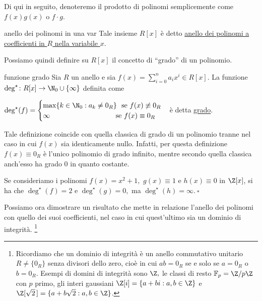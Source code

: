 \noindent Di qui in seguito, denoteremo il prodotto di polinomi semplicemente come $f(x)g(x)$ o $f\cdot g$.

\begin{defn}{anello dei polinomi in una var}
Tale insieme $R[x]$ è detto \underline{anello dei polinomi a coefficienti in $R$ nella variabile $x$}.
\end{defn}

\noindent Possiamo quindi definire su $R[x]$ il concetto di ``grado'' di un polinomio.

\clearpage
\begin{defn}{funzione grado}
Sia $R$ un anello e sia $f(x)=\sum\limits_{i=0}^n a_i x^i\in R[x]$. 
La funzione $\deg^{\star}\colon R[x]\to \N_0\cup \{\infty\}$ definita come 

$\deg^{\star}(f)=\begin{cases} \max\{k\in \N_0: a_k\neq 0_R\} 
\text{ \ se }f(x)\not\equiv 0_R \\ \infty 
\text{ \ \ \ \ \ \ \ \ \ \ \ \ \ \ \ \ \ \ \ \ \ \ \ \ \ \ \ se } 
f(x)\equiv 0_R\end{cases}$è detta \underline{grado}.\footnotemark
\end{defn}


\noindent Tale definizione coincide con quella classica di grado di un polinomio tranne nel caso in cui 
$f(x)$ sia identicamente nullo. Infatti, per questa definizione $f(x)\equiv 0_R$ è l'unico polinomio di grado infinito, 
mentre secondo quella classica anch'esso ha grado $0$ in quanto costante. 

\begin{exm}Se consideriamo i polinomi $f(x)=x^2+1,$ $g(x)\equiv 1$ e $h(x)\equiv 0$ in $\Z[x]$, 
si ha che $\deg^{\star}(f)=2$ e $\deg^{\star}(g)=0,$ ma $\deg^{\star}(h)=\infty. \ \square$\end{exm}

\noindent Possiamo ora dimostrare un risultato che mette in relazione l'anello dei polinomi con quello dei suoi coefficienti, 
nel caso in cui quest'ultimo sia un dominio di integrità.
\footnote{Ricordiamo che un dominio di integrità è un anello commutativo unitario $R\neq \{0_R\}$ senza divisori dello zero, 
cioè in cui $ab=0_R$ se e solo se $a=0_R$ o $b=0_R$. Esempi di domini di integrità sono $\Z,$ 
le classi di resto $\mathbb{F}_p=\Z/p\Z$ con $p$ primo, gli interi gaussiani
$\Z[i]=\left\{a+bi: a,b\in\Z\right\}$ e $\Z[\sqrt{2}\,]=\{a+b\sqrt{2}: a,b\in \Z\}$.}

